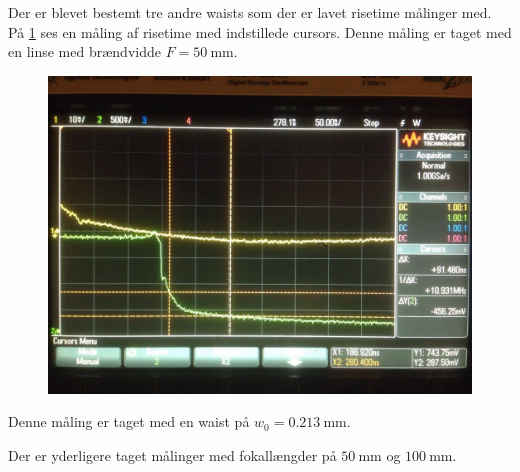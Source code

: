 \documentclass[main]{subfiles}
\begin{document}
Der er blevet bestemt tre andre waists som der er lavet risetime målinger med.
På \cref{fig:screenfigur} ses en måling af risetime med indstillede cursors. Denne måling er taget med en linse med brændvidde $F = \SI{50}{\milli\meter}$.
\begin{figure}[H]
  \includegraphics[width=\linewidth]{tegninger/screenfigur.png}
  \caption{}
  \label{fig:screenfigur}
\end{figure}
Denne måling er taget med en waist på $w_0 = \SI{0,213}{\milli\meter}$.

Der er yderligere taget målinger med fokallængder på $\SI{50}{\milli\meter}$ og $\SI{100}{\milli\meter}$.
\end{document}

